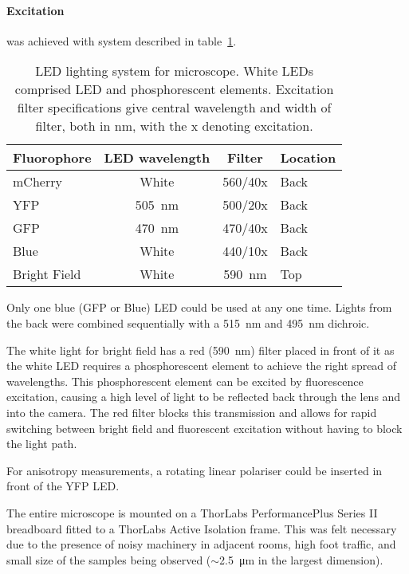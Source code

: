 \documentclass[../main.tex]{subfiles}
\begin{document}
\paragraph{Excitation} was achieved with system described in table~\ref{table:ledlighting}.
\begin{table}[h!]
\begin{center}
\begin{tabular}{l|c|c|l}
\textbf{Fluorophore}	&	\textbf{LED wavelength}	&	\textbf{Filter}	&	\textbf{Location} \\\hline
mCherry	&	White	&	560/40x	&	Back	\\
YFP		&	\SI{505}{\nano\meter}		&	500/20x	&	Back\\
GFP		&	\SI{470}{\nano\meter}		&	470/40x	&	Back\\
Blue		&	White	&	440/10x	&	Back\\
Bright Field		&	White	&	\SI{590}{\nano\meter}	&	Top
\end{tabular}
\caption[LED lighting system]{LED lighting system for microscope. White LEDs comprised LED and phosphorescent elements. Excitation filter specifications give central wavelength and width of filter, both in \si{\nano\meter}, with the x denoting excitation.}
\label{table:ledlighting}
\end{center}
\end{table}

Only one blue (GFP or Blue) LED could be used at any one time. Lights from the back were combined sequentially with a \SI{515}{\nano\meter} and \SI{495}{\nano\meter} dichroic.

The white light for bright field has a red (\SI{590}{\nano\meter}) filter placed in front of it as the white LED requires a phosphorescent element to achieve the right spread of wavelengths. This phosphorescent element can be excited by fluorescence excitation, causing a high level of light to be reflected back through the lens and into the camera. The red filter blocks this transmission and allows for rapid switching between bright field and fluorescent excitation without having to block the light path.

For anisotropy measurements, a rotating linear polariser could be inserted in front of the YFP LED.

The entire microscope is mounted on a ThorLabs PerformancePlus Series II breadboard fitted to a ThorLabs Active Isolation frame. This was felt necessary due to the presence of noisy machinery in adjacent rooms, high foot traffic, and small size of the samples being observed (\(\sim\)\SI{2.5}{\micro\meter} in the largest dimension).
\end{document}
